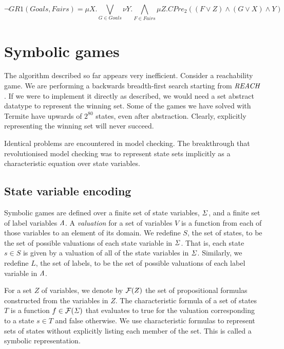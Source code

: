 \begin{equation}
    \neg GR1(Goals, Fairs) = \mu X. \bigvee_{G \in Goals} \nu Y. \bigwedge_{F \in Fairs} \mu Z. CPre_2((F \vee Z) \wedge (G \vee X) \wedge Y)
\end{equation}

\section{Symbolic games}
\label{sec:symbolic_games}

The algorithm described so far appears very inefficient. Consider a reachability game. We are performing a backwards breadth-first search starting from $\mathit{REACH}$. If we were to implement it directly as described, we would need a set abstract datatype to represent the winning set. Some of the games we have solved with Termite have upwards of $2^{80}$ states, even after abstraction. Clearly, explicitly representing the winning set will never succeed. 

Identical problems are encountered in model checking. The breakthrough that revolutionised model checking was to represent state sets implicitly as a characteristic equation over state variables.

\subsection{State variable encoding}

Symbolic games are defined over a finite set of state variables, $\mathit{\Sigma}$, and a finite set of label variables $\mathit{\Lambda}$. A \emph{valuation} for a set of variables $V$ is a function from each of those variables to an element of its domain. We redefine $S$, the set of states, to be the set of possible valuations of each state variable in $\mathit{\Sigma}$. That is, each state $s \in S$ is given by a valuation of all of the state variables in $\mathit{\Sigma}$. Similarly, we redefine $L$, the set of labels, to be the set of possible valuations of each label variable in $\mathit{\Lambda}$.

For a set $Z$ of variables, we denote by $\mathcal{F}(Z)$ the set of propositional formulas constructed from the variables in $Z$. The characteristic formula of a set of states $T$ is a function $f \in \mathcal{F}(\mathit{\Sigma})$ that evaluates to true for the valuation corresponding to a state $s \in T$ and false otherwise. We use characteristic formulas to represent sets of states without explicitly listing each member of the set. This is called a symbolic representation.

